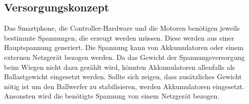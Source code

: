 \subsection{Versorgungskonzept}
	Das Smartphone, die Controller-Hardware und die Motoren benötigen jeweils bestimmte Spannungen, die erzeugt werden müssen. Diese werden aus einer Hauptspannung generiert. Die Spannung kann von Akkumulatoren oder einem externen Netzgerät bezogen werden. Da das Gewicht der Spannungsversorgung beim Wiegen nicht dazu gezählt wird, könnten Akkumulatoren allenfalls als Ballastgewicht eingesetzt werden. Sollte sich zeigen, dass zusätzliches Gewicht nötig ist um den Ballwerfer zu stabilisieren, werden Akkumulatoren eingesetzt. Ansonsten wird die benötigte Spannung von einem Netzgerät bezogen.